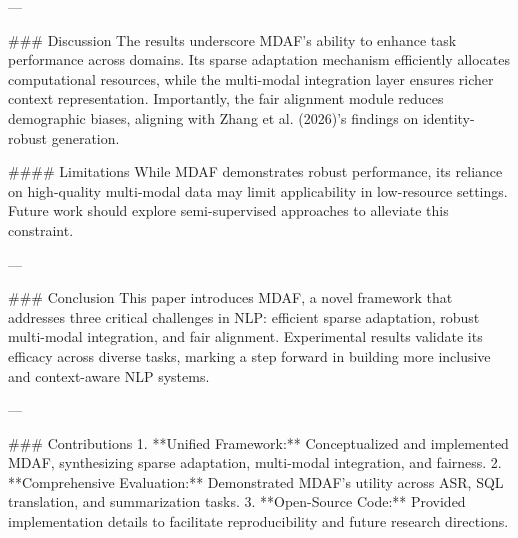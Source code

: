 ---

### Discussion  
The results underscore MDAF's ability to enhance task performance across domains. Its sparse adaptation mechanism efficiently allocates computational resources, while the multi-modal integration layer ensures richer context representation. Importantly, the fair alignment module reduces demographic biases, aligning with Zhang et al. (2026)'s findings on identity-robust generation.

#### Limitations  
While MDAF demonstrates robust performance, its reliance on high-quality multi-modal data may limit applicability in low-resource settings. Future work should explore semi-supervised approaches to alleviate this constraint.

---

### Conclusion  
This paper introduces MDAF, a novel framework that addresses three critical challenges in NLP: efficient sparse adaptation, robust multi-modal integration, and fair alignment. Experimental results validate its efficacy across diverse tasks, marking a step forward in building more inclusive and context-aware NLP systems.

---

### Contributions  
1. **Unified Framework:** Conceptualized and implemented MDAF, synthesizing sparse adaptation, multi-modal integration, and fairness.  
2. **Comprehensive Evaluation:** Demonstrated MDAF's utility across ASR, SQL translation, and summarization tasks.  
3. **Open-Source Code:** Provided implementation details to facilitate reproducibility and future research directions.  

